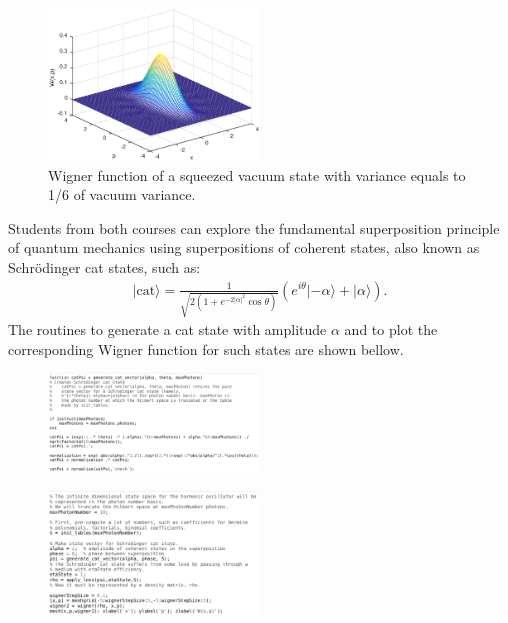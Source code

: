 \documentclass[twocolumn]{rbef}
\begin{document}
\begin{figure}[h]
\includegraphics[width=0.5\textwidth]{wigner-squeezed1.eps}
\caption{Wigner function of a squeezed vacuum state with variance equals to 1/6 of vacuum variance.}
\label{fig-squeezed-state}
\end{figure}

Students from both courses can explore the fundamental superposition principle of quantum mechanics using superpositions of coherent states, also known as Schr\"odinger cat states, such as:
\begin{eqnarray}
|\mathrm{cat}\rangle = \frac{1}{\sqrt{2\left( 1+ e^{-2|\alpha|^2} \cos \theta \right)}} \left(e^{i \theta} |-\alpha\rangle + |\alpha\rangle \right).
\end{eqnarray}
The routines to generate a cat state with amplitude $\alpha$ and to plot the corresponding Wigner function for such states are shown bellow. 
\begin{figure}[h!]
\includegraphics[width=0.5\textwidth]{generate_cat_vector.eps}
\end{figure}

\begin{figure}[h!]
\includegraphics[width=0.5\textwidth]{wigner-cat.eps}
\end{figure}
\end{document}
